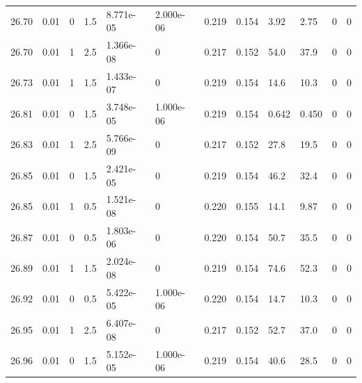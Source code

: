 \documentclass[preview]{standalone}
\begin{document}
{{{{{{{{{{{{\begin{tabular}{L{1.2cm}C{1.2cm} C{0.3cm}C{0.5cm} C{1.4cm}C{1.4cm} C{1.4cm}C{1.4cm} C{1.6cm}C{1.6cm} C{1.6cm}C{1.6cm}}
  26.70  &  0.01  & 0     & 1.5 &  8.771e-05  & 2.000e-06  &  0.219&   0.154& 3.92 & 2.75   &  0 & 0  \\ 
  26.70  &  0.01  & 1     & 2.5 &  1.366e-08  & 0  &  0.217&   0.152& 54.0 & 37.9   &  0 & 0  \\ 
  26.73  &  0.01  & 1     & 1.5 &  1.433e-07  & 0  &  0.219&   0.154& 14.6 & 10.3   &  0 & 0  \\ 
  26.81  &  0.01  & 0     & 1.5 &  3.748e-05  & 1.000e-06  &  0.219&   0.154& 0.642 & 0.450   &  0 & 0  \\ 
  26.83  &  0.01  & 1     & 2.5 &  5.766e-09  & 0  &  0.217&   0.152& 27.8 & 19.5   &  0 & 0  \\ 
  26.85  &  0.01  & 0     & 1.5 &  2.421e-05  & 0  &  0.219&   0.154& 46.2 & 32.4   &  0 & 0  \\ 
  26.85  &  0.01  & 1     & 0.5 &  1.521e-08  & 0  &  0.220&   0.155& 14.1 & 9.87   &  0 & 0  \\ 
  26.87  &  0.01  & 0     & 0.5 &  1.803e-06  & 0  &  0.220&   0.154& 50.7 & 35.5   &  0 & 0  \\ 
  26.89  &  0.01  & 1     & 1.5 &  2.024e-08  & 0  &  0.219&   0.154& 74.6 & 52.3   &  0 & 0  \\ 
  26.92  &  0.01  & 0     & 0.5 &  5.422e-05  & 1.000e-06  &  0.220&   0.154& 14.7 & 10.3   &  0 & 0  \\ 
  26.95  &  0.01  & 1     & 2.5 &  6.407e-08  & 0  &  0.217&   0.152& 52.7 & 37.0   &  0 & 0  \\ 
  26.96  &  0.01  & 0     & 1.5 &  5.152e-05  & 1.000e-06  &  0.219&   0.154& 40.6 & 28.5   &  0 & 0  \\ 
\hline 
\end{tabular} 

}}}}}}}}}}}}
\end{document}
